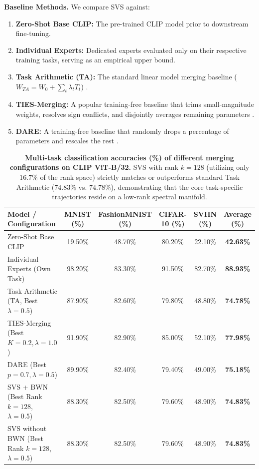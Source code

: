 \textbf{Baseline Methods.} We compare SVS against:
\begin{enumerate}
    \item \textbf{Zero-Shot Base CLIP:} The pre-trained CLIP model prior to downstream fine-tuning.
    \item \textbf{Individual Experts:} Dedicated experts evaluated only on their respective training tasks, serving as an empirical upper bound.
    \item \textbf{Task Arithmetic (TA):} The standard linear model merging baseline ($W_{TA} = W_0 + \sum_t \lambda_t T_t$) \cite{ilharco2022editing}.
    \item \textbf{TIES-Merging:} A popular training-free baseline that trims small-magnitude weights, resolves sign conflicts, and disjointly averages remaining parameters \cite{yadav2023ties}.
    \item \textbf{DARE:} A training-free baseline that randomly drops a percentage of parameters and rescales the rest \cite{yu2023dare}.
\end{enumerate}

\begin{table}[t]
\caption{\textbf{Multi-task classification accuracies (\%) of different merging configurations on CLIP ViT-B/32.} SVS with rank $k=128$ (utilizing only $16.7\%$ of the rank space) strictly matches or outperforms standard Task Arithmetic ($74.83\%$ vs. $74.78\%$), demonstrating that the core task-specific trajectories reside on a low-rank spectral manifold.}
\label{tab:main_results}
\vskip 0.15in
\begin{center}
\begin{small}
\begin{sc}
\begin{tabular}{lccccc}
\toprule
Model / Configuration & MNIST (\%) & FashionMNIST (\%) & CIFAR-10 (\%) & SVHN (\%) & \textbf{Average (\%)} \\
\midrule
Zero-Shot Base CLIP & 19.50\% & 48.70\% & 80.20\% & 22.10\% & \textbf{42.63\%} \\
Individual Experts (Own Task) & 98.20\% & 83.30\% & 91.50\% & 82.70\% & \textbf{88.93\%} \\
\midrule
Task Arithmetic (TA, Best $\lambda=0.5$) & 87.90\% & 82.60\% & 79.80\% & 48.80\% & \textbf{74.78\%} \\
TIES-Merging (Best $K=0.2, \lambda=1.0$) & 91.90\% & 82.90\% & 85.00\% & 52.10\% & \textbf{77.98\%} \\
DARE (Best $p=0.7, \lambda=0.5$) & 89.90\% & 82.40\% & 79.40\% & 49.00\% & \textbf{75.18\%} \\
SVS + BWN (Best Rank $k=128$, $\lambda=0.5$) & 88.30\% & 82.50\% & 79.60\% & 48.90\% & \textbf{74.83\%} \\
SVS without BWN (Best Rank $k=128$, $\lambda=0.5$) & 88.30\% & 82.50\% & 79.60\% & 48.90\% & \textbf{74.83\%} \\
\bottomrule
\end{tabular}
\end{sc}
\end{small}
\end{center}
\vskip -0.1in
\end{table}


